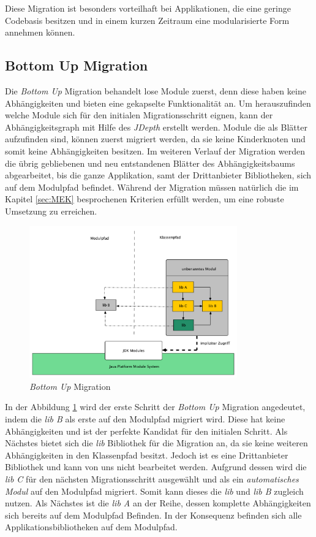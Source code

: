 	Diese Migration ist besonders vorteilhaft bei Applikationen, die eine geringe Codebasis besitzen und in einem kurzen Zeitraum eine modularisierte Form annehmen können. 

\subsection{Bottom Up Migration} \label{sec:bottomUP}
	Die \textit{Bottom Up} Migration behandelt lose Module zuerst, denn diese haben keine Abhängigkeiten und bieten eine gekapselte Funktionalität an. Um herauszufinden welche Module sich für den initialen Migrationsschritt eignen, kann der Abhängigkeitsgraph mit Hilfe des \textit{JDepth} erstellt werden. Module die als Blätter aufzufinden sind, können zuerst migriert werden, da sie keine Kinderknoten und somit keine Abhängigkeiten besitzen. Im weiteren Verlauf der Migration werden die übrig gebliebenen und neu entstandenen Blätter des Abhängigkeitsbaums abgearbeitet, bis die ganze Applikation, samt der Drittanbieter Bibliotheken, sich auf dem Modulpfad befindet. Während der Migration müssen natürlich die im Kapitel \ref{sec:MEK} besprochenen Kriterien erfüllt werden, um eine robuste Umsetzung zu erreichen. \cite{javaMod9,modulProgJava9,java9modRevealed,modulMitJava9,masteringJava9} \bigbreak
	\begin{figure}[h]
		\centering
	    \includegraphics[width=0.8\textwidth]{material/images/bottomUP.pdf}
	    \caption{\textit{Bottom Up} Migration \cite{modulMitJava9}}
	    \label{fig:BUM}
  	\end{figure}
	In der Abbildung \ref{fig:BUM} wird der erste Schritt der \textit{Bottom Up} Migration angedeutet, indem die \textit{lib B} als erste auf den Modulpfad migriert wird. Diese hat keine Abhängigkeiten und ist der perfekte Kandidat für den initialen Schritt. Als Nächstes bietet sich die \textit{lib} Bibliothek für die Migration an, da sie keine weiteren Abhängigkeiten in den Klassenpfad besitzt. Jedoch ist es eine Drittanbieter Bibliothek und kann von uns nicht bearbeitet werden. Aufgrund dessen wird die \textit{lib C} für  den nächsten Migrationsschritt ausgewählt und als ein \textit{automatisches Modul} auf den Modulpfad migriert. Somit kann dieses die \textit{lib} und \textit{lib B} zugleich nutzen. Als Nächstes ist die \textit{lib A} an der Reihe, dessen komplette Abhängigkeiten sich bereits auf dem Modulpfad Befinden. In der Konsequenz befinden sich alle Applikationsbibliotheken auf dem Modulpfad. \cite{javaMod9,modulProgJava9,java9modRevealed,modulMitJava9,masteringJava9} \bigbreak

